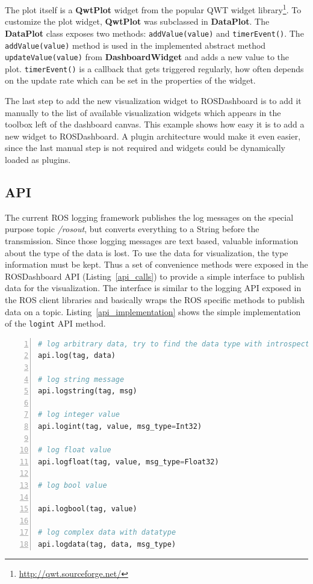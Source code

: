 The plot itself is a \textbf{QwtPlot} widget from the popular QWT widget library\footnote{\url{http://qwt.sourceforge.net/}}. To customize the plot widget, \textbf{QwtPlot} was subclassed in \textbf{DataPlot}. The \textbf{DataPlot} class exposes two methods: \verb+addValue(value)+ and \verb+timerEvent()+. The \verb+addValue(value)+ method is used in the implemented abstract method \verb+updateValue(value)+ from \textbf{DashboardWidget} and adds a new value to the plot. \verb+timerEvent()+ is a callback that gets triggered regularly, how often depends on the update rate which can be set in the properties of the widget.

The last step to add the new visualization widget to ROSDashboard is to add it manually to the list of available visualization widgets which appears in the toolbox left of the dashboard canvas. This example shows how easy it is to add a new widget to ROSDashboard. A plugin architecture would make it even easier, since the last manual step is not required and widgets could be dynamically loaded as plugins.

\subsection{API}
\label{api_section}
The current ROS logging framework publishes the log messages on the special purpose topic \emph{/rosout}, but converts everything to a String before the transmission. Since those logging messages are text based, valuable information about the type of the data is lost. To use the data for visualization, the type information must be kept. Thus a set of convenience methods were exposed in the ROSDashboard API (Listing~\ref{api_calls}) to provide a simple interface to publish data for the visualization. The interface is similar to the logging API exposed in the ROS client libraries and basically wraps the ROS specific methods to publish data on a topic. Listing~\ref{api_implementation} shows the simple implementation of the \verb+logint+ API method.

\begin{lstlisting}[frame=single,caption={ROSDashboard API methods.},label=api_calls,language=Python,numbers=left,breaklines=true]
# log arbitrary data, try to find the data type with introspection
api.log(tag, data)

# log string message
api.logstring(tag, msg)

# log integer value
api.logint(tag, value, msg_type=Int32)

# log float value
api.logfloat(tag, value, msg_type=Float32)

# log bool value

api.logbool(tag, value)

# log complex data with datatype
api.logdata(tag, data, msg_type)
\end{lstlisting}

